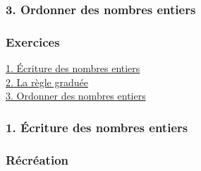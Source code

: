 \documentclass[8pt]{beamer}
\newcommand{\cheminatome}{../atomes}
\begin{document}
\begin{frame}
\frametitle{3. Ordonner des nombres entiers\hypertarget{section3}{ } \hspace{0pt plus 1 filll} \hyperlink{cours}{\beamerbutton{\faReply}} \hyperlinkslideprev{{\Huge \faAngleLeft}} \hyperlink{menu}{\beamerbutton{\faHome}} \hyperlinkslidenext{{\Huge \faAngleRight}}}

\end{frame}

\begin{frame}
\frametitle{ \hspace{0pt plus 1 filll} \hyperlink{cours}{\beamerbutton{\faReply}} \hyperlinkslideprev{{\Huge \faAngleLeft}} \hyperlink{menu}{\beamerbutton{\faHome}} \hyperlinkslidenext{{\Huge \faAngleRight}}}

\end{frame}

\begin{frame}
\frametitle{ \hspace{0pt plus 1 filll} \hyperlink{cours}{\beamerbutton{\faReply}} \hyperlinkslideprev{{\Huge \faAngleLeft}} \hyperlink{menu}{\beamerbutton{\faHome}} {\Huge \textcolor{blue!10!white}{\faAngleRight}}}

\end{frame}

\begin{frame}
\frametitle{\hypertarget{exercices}{\textbf{Exercices}} \hspace{0pt plus 1 filll} \hyperlink{menu}{\beamerbutton{\faHome}}}
\begin{Large}
\hyperlink{section1exo}{1. Écriture des nombres entiers} \\
\vspace{5mm}
\hyperlink{section2exo}{2. La règle graduée} \\
\vspace{5mm}
\hyperlink{section3exo}{3. Ordonner des nombres entiers}
\end{Large}
\end{frame}

\begin{frame}
\frametitle{\hypertarget{section1exo}{1. Écriture des nombres entiers} \hspace{0pt plus 1 filll} \hyperlink{exercices}{\beamerbutton{\faReply}} {\Huge \textcolor{blue!10!white}{\faAngleLeft}} \hyperlink{menu}{\beamerbutton{\faHome}} \hyperlinkslidenext{{\Huge \faAngleRight}}}

\end{frame}

\begin{frame}[t]
\frametitle{\hypertarget{recreation}{\textbf{Récréation}} \hspace{0pt plus 1 filll} \hyperlink{menu}{\beamerbutton{\faHome}}}
\end{frame}
\end{document}

